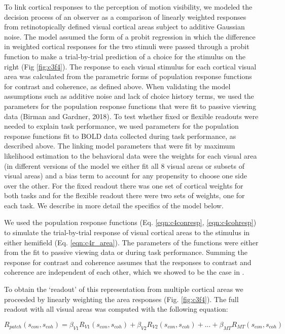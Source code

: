 To link cortical responses to the perception of motion visibility, we modeled the decision process of an observer as a comparison of linearly weighted responses from retinotopically defined visual cortical areas subject to additive Gaussian noise. The model assumed the form of a probit regression in which the difference in weighted cortical responses for the two stimuli were passed through a probit function to make a trial-by-trial prediction of a choice for the stimulus on the right (Fig \ref{fig:c3f4}). The response to each visual stimulus for each cortical visual area was calculated from the parametric forms of population response functions for contrast and coherence, as defined above. When validating the model assumptions such as additive noise and lack of choice history terms, we used the parameters for the population response functions that were fit to passive viewing data (Birman and Gardner, 2018). To test whether fixed or flexible readouts were needed to explain task performance, we used parameters for the population response functions fit to BOLD data collected during task performance, as described above. The linking model parameters that were fit by maximum likelihood estimation to the behavioral data were the weights for each visual area (in different versions of the model we either fit all 8 visual areas or subsets of visual areas) and a bias term to account for any propensity to choose one side over the other. For the fixed readout there was one set of cortical weights for both tasks and for the flexible readout there were two sets of weights, one for each task. We describe in more detail the specifics of the model below.

We used the population response functions (Eq. \ref{eqn:c4conresp}, \ref{eqn:c4cohresp}) to simulate the trial-by-trial response of visual cortical areas to the stimulus in either hemifield (Eq. \ref{eqn:c4r_area}). The parameters of the functions were either from the fit to passive viewing data or during task performance. Summing the response for contrast and coherence assumes that the responses to contrast and coherence are independent of each other, which we showed to be the case in \citet{Birman2018-sp}.

To obtain the `readout' of this representation from multiple cortical areas we proceeded by linearly weighting the area responses (Fig. \ref{fig:c3f4}). The full readout with all visual areas was computed with the following equation:

\begin{equation}
    R_{patch}(s_{con},s_{coh})=\beta_{V1}R_{V1}(s_{con},s_{coh})+\beta_{V2}R_{V2}(s_{con},s_{coh})+...+\beta_{MT}R_{MT}(s_{con},s_{coh})
    \label{eqn:c4r_patch}
\end{equation}


